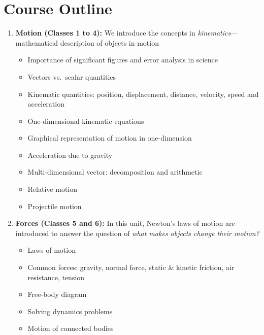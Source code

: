 \documentclass{../oss-handout}
\begin{document}
\section*{Course Outline}
\begin{enumerate}[itemsep=.05ex,label={\textbf{\arabic*.}}]
\item\textbf{Motion (Classes 1 to 4):} We introduce the concepts in
  \emph{kinematics}---mathematical description of objects in motion
  \begin{itemize}[nosep]
  \item Importance of significant figures and error analysis in science
  \item Vectors vs.\ scalar quantities
  \item Kinematic quantities: position, displacement, distance, velocity, speed
    and acceleration
  \item One-dimensional kinematic equations
  \item Graphical representation of motion in one-dimension
  \item Acceleration due to gravity
  \item Multi-dimensional vector: decomposition and  arithmetic
  \item Relative motion
  \item Projectile motion
  \end{itemize}

\item\textbf{Forces (Classes 5 and 6):} In this unit, Newton's laws of motion
  are introduced to answer the question of \emph{what makes objects change
  their motion?}
  \begin{itemize}[nosep]
  \item Laws of motion
  \item Common forces: gravity, normal force, static \& kinetic friction,
    air resistance, tension
  \item Free-body diagram
  \item Solving dynamics problems
  \item Motion of connected bodies
  \end{itemize}
  

\end{enumerate}
\end{document}
